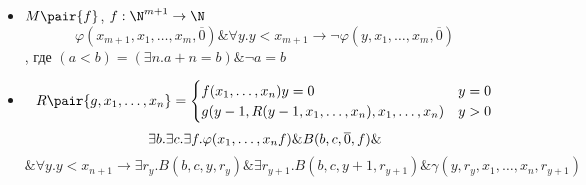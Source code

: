 \documentclass[english]{article}
\begin{document}
\begin{remark}
	\-
	\begin{itemize}
		\item \(M\pair{f}\),  \(f: \N^{m + 1} \to \N\)
		      \[ \varphi(x_{m + 1}, x_1, \dots, x_m, \overline{0}) \& \forall y. y < x_{m + 1} \to \neg \varphi(y, x_1, \dots, x_m, \overline{0}) \]
		      , где \((a < b) = (\exists n. a+ n = b)\&\neg a = b\)
		\item \[R\pair{g, x_1, \dots, x_n}  = \begin{cases}
				      f(x_1, \dots, x_n) y = 0                             & y = 0 \\
				      g(y - 1, R(y - 1, x_1, \dots, x_n), x_1, \dots, x_n) & y > 0
			      \end{cases}\]
		      \[ \exists b. \exists c. \exists f. \varphi(x_1, \dots, x_n f) \& B(b, c, \overline{0}, f) \& \\ \]
		      \[ \& \forall y. y < x_{n + 1} \to \exists r_{y}. B(b, c, y, r_{y})\&\exists r_{y + 1}. B(b, c, y + 1, r_{y + 1})\&\gamma(y, r_{y}, x_1, \dots, x_n, r_{y + 1}) \]
	\end{itemize}
	\label{orge0e7aea}
\end{remark}
\end{document}
